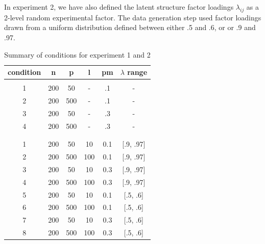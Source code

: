 	In experiment 2, we have also defined the latent structure factor loadings $\lambda_{ij}$ as a 2-level random experimental factor.
	The data generation step used factor loadings drawn from a uniform distribution defined between either .5 and .6, or 
	or .9 and .97.

\begin{table}[h]
   \begin{center}
        \begin{tabular}{ c c c c c c }
		\textbf{condition} & \textbf{n} & \textbf{p} & \textbf{l} & \textbf{pm} & \textbf{$\lambda$ range} \\ 
		\hline

		\rowcolor{Gray}
 		\multicolumn{6}{c}{Experiment 1} \\
		\hline

		1 & 200 & 50  & - & .1 & - \\
		2 & 200 & 500 & - & .1 & - \\
		3 & 200 & 50  & - & .3 & - \\
		4 & 200 & 500 & - & .3 & - \\

		\hline

		& & & & & \\ 

		\rowcolor{Gray}
 		\multicolumn{6}{c}{Experiment 2} \\
		\hline

		1 & 200 & 50 &  10 &  0.1 & [.9, .97] \\
		2 & 200 & 500 & 100 & 0.1 & [.9, .97] \\
		3 & 200 & 50 &  10 &  0.3 & [.9, .97] \\
		4 & 200 & 500 & 100 & 0.3 & [.9, .97] \\
		5 & 200 & 50 &  10 &  0.1 & [.5, .6]  \\
		6 & 200 & 500 & 100 & 0.1 & [.5, .6]  \\
		7 & 200 & 50 &  10 &  0.3 & [.5, .6]  \\
		8 & 200 & 500 & 100 & 0.3 & [.5, .6]  \\

		\hline
        \end{tabular}
    \end{center}
\caption{Summary of conditions for experiment 1 and 2} \label{table:condSum}
\end{table}

\FloatBarrier %


